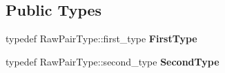 \subsection*{Public Types}
\begin{DoxyCompactItemize}
\item 
typedef Raw\+Pair\+Type\+::first\+\_\+type {\bfseries First\+Type}\hypertarget{classtesting_1_1internal_1_1PairMatcherImpl_a9de66d76f0ebb0f107a9c18903b03176}{}\label{classtesting_1_1internal_1_1PairMatcherImpl_a9de66d76f0ebb0f107a9c18903b03176}

\item 
typedef Raw\+Pair\+Type\+::second\+\_\+type {\bfseries Second\+Type}\hypertarget{classtesting_1_1internal_1_1PairMatcherImpl_ad63c9ff4f1aff81562efca293ff5aca9}{}\label{classtesting_1_1internal_1_1PairMatcherImpl_ad63c9ff4f1aff81562efca293ff5aca9}

\end{DoxyCompactItemize}
